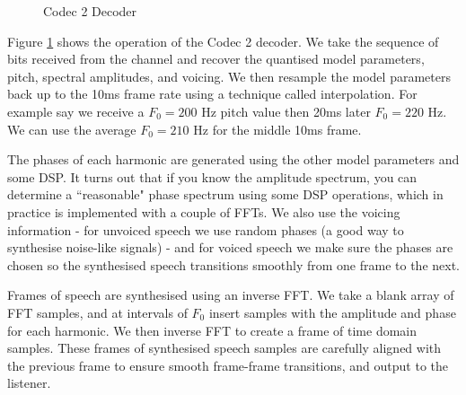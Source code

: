 \documentclass{article}
\begin{document}
\begin{figure}[h]
\caption{Codec 2 Decoder}
\label{fig:codec2_decoder}
\begin{center}
\end{center}
\end{figure}

Figure \ref{fig:codec2_decoder} shows the operation of the Codec 2 decoder.  We take the sequence of bits received from the channel and recover the quantised model parameters, pitch, spectral amplitudes, and voicing.  We then resample the model parameters back up to the 10ms frame rate using a technique called interpolation.  For example say we receive a $F_0=200$ Hz pitch value then 20ms later $F_0=220$ Hz.  We can use the average $F_0=210$ Hz for the middle 10ms frame.

The phases of each harmonic are generated using the other model parameters and some DSP.  It turns out that if you know the amplitude spectrum, you can determine a ``reasonable" phase spectrum using some DSP operations, which in practice is implemented with a couple of FFTs.  We also use the voicing information - for unvoiced speech we use random phases (a good way to synthesise noise-like signals) - and for voiced speech we make sure the phases are chosen so the synthesised speech transitions smoothly from one frame to the next.

Frames of speech are synthesised using an inverse FFT.  We take a blank array of FFT samples, and at intervals of $F_0$ insert samples with the amplitude and phase for each harmonic.  We then inverse FFT to create a frame of time domain samples.  These frames of synthesised speech samples are carefully aligned with the previous frame to ensure smooth frame-frame transitions, and output to the listener.
\end{document}
